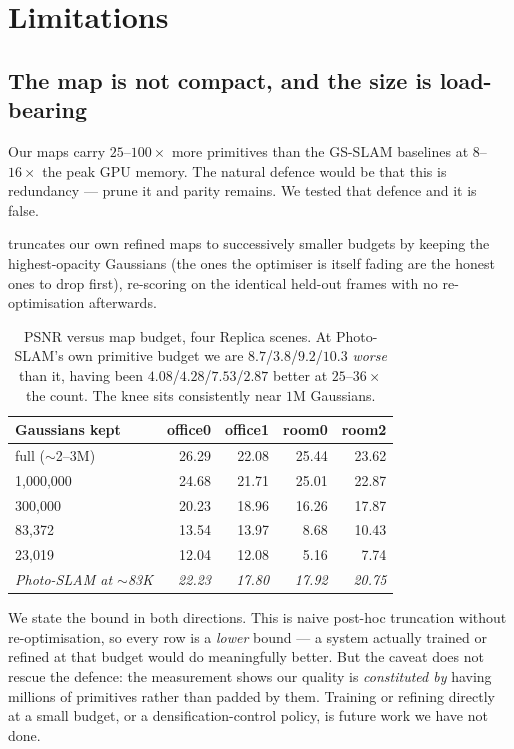 \section{Limitations}
\label{sec:limitations}

\subsection{The map is not compact, and the size is load-bearing}
\label{sec:lim:compact}
Our maps carry $25$--$100\times$ more primitives than the GS-SLAM baselines at
$8$--$16\times$ the peak GPU memory. The natural defence would be that this is
redundancy --- prune it and parity remains. We tested that defence and it is
false.

 truncates our own refined maps to successively smaller budgets
by keeping the highest-opacity Gaussians (the ones the optimiser is itself
fading are the honest ones to drop first), re-scoring on the identical
held-out frames with no re-optimisation afterwards.

\begin{table}[t]
\centering\small
\setlength{\tabcolsep}{4pt}
\begin{tabular}{@{}lrrrr@{}}
\toprule
Gaussians kept & office0 & office1 & room0 & room2 \\
\midrule
full ($\sim$2--3M)     & 26.29 & 22.08 & 25.44 & 23.62 \\
1{,}000{,}000          & 24.68 & 21.71 & 25.01 & 22.87 \\
300{,}000              & 20.23 & 18.96 & 16.26 & 17.87 \\
83{,}372               & 13.54 & 13.97 & \phantom{0}8.68 & 10.43 \\
23{,}019               & 12.04 & 12.08 & \phantom{0}5.16 & \phantom{0}7.74 \\
\midrule
\emph{Photo-SLAM at $\sim$83K} & \emph{22.23} & \emph{17.80} & \emph{17.92} & \emph{20.75} \\
\bottomrule
\end{tabular}
\caption{PSNR versus map budget, four Replica scenes. At Photo-SLAM's own
primitive budget we are $8.7$/$3.8$/$9.2$/$10.3$\dB{} \emph{worse} than it,
having been $4.08$/$4.28$/$7.53$/$2.87$\dB{} better at $25$--$36\times$ the
count. The knee sits consistently near $1$M Gaussians.}
\label{tab:curve}
\end{table}

We state the bound in both directions. This is naive post-hoc truncation
without re-optimisation, so every row is a \emph{lower} bound --- a system
actually trained or refined at that budget would do meaningfully better. But
the caveat does not rescue the defence: the measurement shows our quality is
\emph{constituted by} having millions of primitives rather than padded by them.
Training or refining directly at a small budget, or a densification-control
policy, is future work we have not done.

